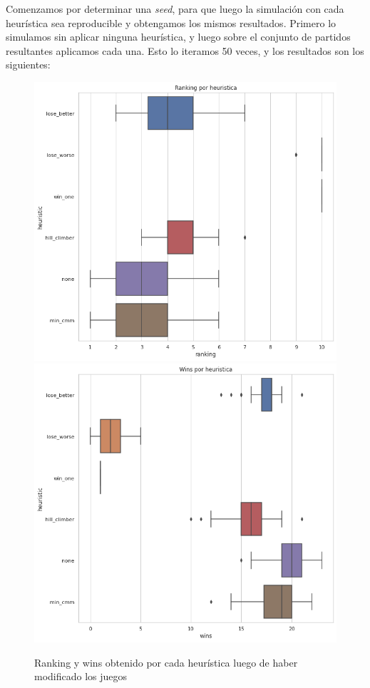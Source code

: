 \documentclass[a4paper]{article}
\begin{document}
Comenzamos por determinar una \textit{seed}, para que luego la simulación con cada heurística sea reproducible y obtengamos los mismos resultados. Primero lo simulamos sin aplicar ninguna heurística, y luego sobre el conjunto de partidos resultantes aplicamos cada una. Esto lo iteramos 50 veces, y los resultados son los siguientes:

\begin{figure}[H]
    \begin{center}
        \includegraphics[scale=0.45]{img/heur/ranking-inicial.png}
        \includegraphics[scale=0.45]{img/heur/wins-inicial.png}
        \caption{Ranking y wins obtenido por cada heurística luego de haber modificado los juegos}
        \label{heur-initial}
    \end{center}
\end{figure}
\end{document}
